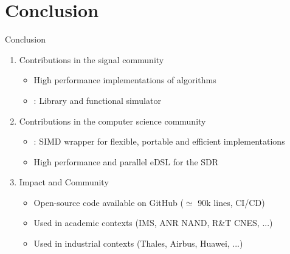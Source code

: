 
\section[Conclusion]{Conclusion}


\begin{frame}{Conclusion}
  \vfill
  \begin{enumerate}
    \item Contributions in the signal community
    \begin{itemize}
      \item High performance implementations of algorithms%
      \item \AFFECT: Library and functional simulator%
    \end{itemize}
    \vspace{0.3cm}
    \pause
    \item Contributions in the computer science community
    \begin{itemize}
      \item \MIPP: SIMD wrapper for flexible, portable and efficient implementations%
      \item High performance and parallel eDSL for the SDR
    \end{itemize}
    \vspace{0.3cm}
    \pause
    \item Impact and Community
    \begin{itemize}
      \item Open-source code available on GitHub ($\simeq $ 90k lines, CI/CD)
      \item Used in academic contexts (IMS, ANR NAND, R\&T CNES, ...)
      \item Used in industrial contexts (Thales, Airbus, Huawei, ...)
    \end{itemize}
  \end{enumerate}
  \vfill
\end{frame}


